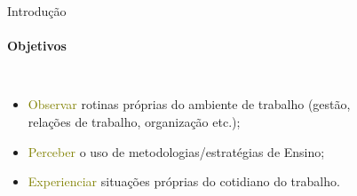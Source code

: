 \documentclass[aspectratio=169]{beamer}
\begin{document}
\begin{frame}{Introdução}
	\framesubtitle{Objetivos}
	\begin{columns}
		\begin{itemize}
			\item<1-> \textcolor<1>{olive}{Observar} rotinas próprias do ambiente de trabalho (gestão, relações de trabalho, organização etc.);
			\item<2-> \textcolor<2>{olive}{Perceber} o uso de metodologias/estratégias de Ensino;
			\item<3-> \textcolor<3>{olive}{Experienciar} situações próprias do cotidiano do trabalho.
		\end{itemize}

		\begin{figure}[htb!]
			\centering
\end{figure}
\end{columns}
\end{frame}
\end{document}
